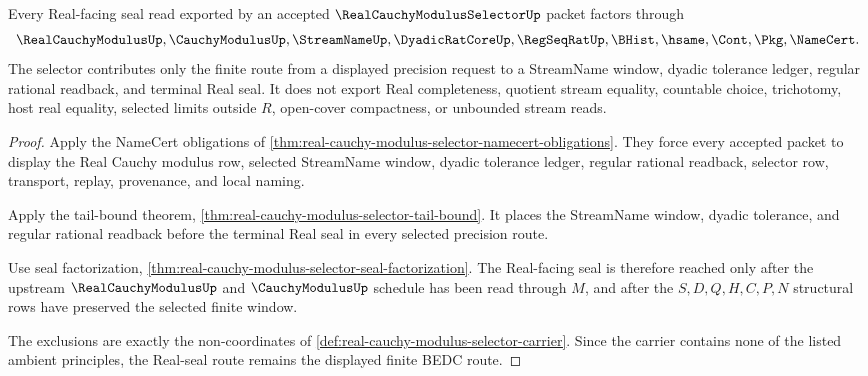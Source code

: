 \begin{theorem}
\label{thm:real-cauchy-modulus-selector-real-seal-route}
Every Real-facing seal read exported by an accepted $\RealCauchyModulusSelectorUp$ packet factors through
$$
\RealCauchyModulusUp,\CauchyModulusUp,\StreamNameUp,\DyadicRatCoreUp,\RegSeqRatUp,\BHist,\hsame,\Cont,\Pkg,\NameCert .
$$
The selector contributes only the finite route from a displayed precision request to a StreamName window, dyadic tolerance ledger, regular rational readback, and terminal Real seal. It does not export Real completeness, quotient stream equality, countable choice, trichotomy, host real equality, selected limits outside $R$, open-cover compactness, or unbounded stream reads.
\end{theorem}
\begin{proof}
Apply the NameCert obligations of \autoref{thm:real-cauchy-modulus-selector-namecert-obligations}. They force every accepted packet to display the Real Cauchy modulus row, selected StreamName window, dyadic tolerance ledger, regular rational readback, selector row, transport, replay, provenance, and local naming.

Apply the tail-bound theorem, \autoref{thm:real-cauchy-modulus-selector-tail-bound}. It places the StreamName window, dyadic tolerance, and regular rational readback before the terminal Real seal in every selected precision route.

Use seal factorization, \autoref{thm:real-cauchy-modulus-selector-seal-factorization}. The Real-facing seal is therefore reached only after the upstream $\RealCauchyModulusUp$ and $\CauchyModulusUp$ schedule has been read through $M$, and after the $S,D,Q,H,C,P,N$ structural rows have preserved the selected finite window.

The exclusions are exactly the non-coordinates of \autoref{def:real-cauchy-modulus-selector-carrier}. Since the carrier contains none of the listed ambient principles, the Real-seal route remains the displayed finite BEDC route.
\end{proof}


